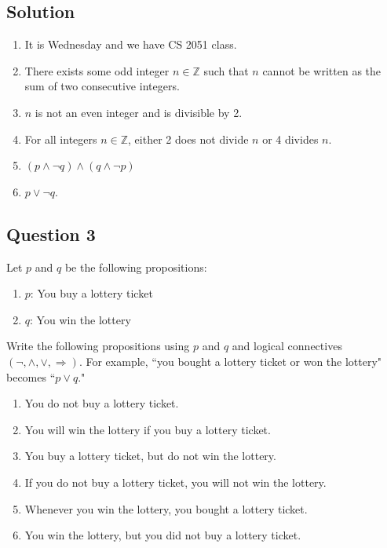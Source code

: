 \documentclass{article}
\begin{document}
\subsection*{Solution}
    \begin{enumerate}
        \item It is Wednesday and we have CS 2051 class.
        \item There exists some odd integer $n \in \mathbb{Z}$ such that $n$ cannot be written as the sum of two consecutive integers.
        \item $n$ is not an even integer and is divisible by 2.
        \item For all integers $n \in \mathbb{Z}$, either 2 does not divide $n$ or 4 divides $n$.
        \item $(p \land \neg q) \land (q \land \neg p)$
        \item $p \lor \neg q$.
    \end{enumerate}

\subsection*{Question 3}
    Let $p$ and $q$ be the following propositions:
    \begin{enumerate}[label = , itemsep = 2pt, parsep = 0pt]
        \item $p$: You buy a lottery ticket
        \item $q$: You win the lottery
    \end{enumerate}
    Write the following propositions using $p$ and $q$ and logical connectives $(\neg, \land, \lor, \Rightarrow)$. For example, ``you bought a lottery ticket or won the lottery" becomes ``$p \lor q$."
    \begin{enumerate}
        \item You do not buy a lottery ticket.
        \item You will win the lottery if you buy a lottery ticket.
        \item You buy a lottery ticket, but do not win the lottery. 
        \item If you do not buy a lottery ticket, you will not win the lottery. 
        \item Whenever you win the lottery, you bought a lottery ticket.
        \item You win the lottery, but you did not buy a lottery ticket.
    \end{enumerate}
\end{document}
